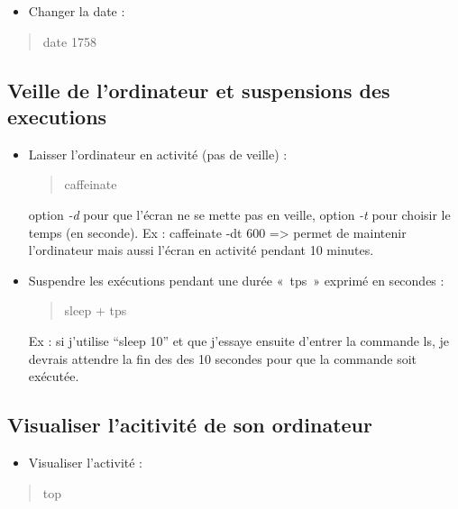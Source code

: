\begin{itemize}
\tightlist
\item
  Changer la date :
\end{itemize}

\begin{quote}
date 1758
\end{quote}

\subsection{Veille de l'ordinateur et suspensions des
executions}\label{veille-de-lordinateur-et-suspensions-des-executions}

\begin{itemize}
\item
  Laisser l'ordinateur en activité (pas de veille) :

  \begin{quote}
  caffeinate
  \end{quote}

  option \emph{-d} pour que l'écran ne se mette pas en veille, option
  \emph{-t} pour choisir le temps (en seconde). Ex : caffeinate -dt 600
  =\textgreater{} permet de maintenir l'ordinateur mais aussi l'écran en
  activité pendant 10 minutes.
\item
  Suspendre les exécutions pendant une durée «~tps~» exprimé en secondes
  :

  \begin{quote}
  sleep + tps
  \end{quote}

  Ex : si j'utilise ``sleep 10'' et que j'essaye ensuite d'entrer la
  commande ls, je devrais attendre la fin des des 10 secondes pour que
  la commande soit exécutée.
\end{itemize}

\subsection{Visualiser l'acitivité de son
ordinateur}\label{visualiser-lacitivituxe9-de-son-ordinateur}

\begin{itemize}
\tightlist
\item
  Visualiser l'activité :
\end{itemize}

\begin{quote}
top
\end{quote}

